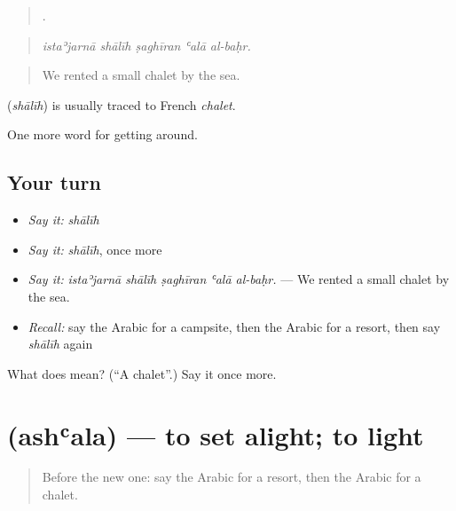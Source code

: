 \begin{quote}
    .
\end{quote}

\begin{quote}
\emph{istaʾjarnā shālīh ṣaghīran ʿalā al-baḥr.}
\end{quote}

\begin{quote}
We rented a small chalet by the sea.
\end{quote}

\begin{cousinweb}
\textbf{} (\emph{shālīh}) is usually traced to French \emph{chalet}.
\end{cousinweb}

\begin{grammarlens}[title={What you've built}]
One more word for getting around.
\end{grammarlens}

\subsection*{Your turn}
\begin{itemize}
\raggedright
  \item \emph{Say it:} \emph{shālīh}
  \item \emph{Say it:} \emph{shālīh}, once more
  \item \emph{Say it:} \emph{istaʾjarnā shālīh ṣaghīran ʿalā al-baḥr.} — We rented a small chalet by the sea.
  \item \emph{Recall:} say the Arabic for a campsite, then the Arabic for a resort, then say \emph{shālīh} again
\end{itemize}

\begin{tcolorbox}[breakable,colback=teal!4,colframe=teal!35!black,title={Before you move on}]
What does  mean? (\textquotedblleft{}A chalet\textquotedblright{}.) Say it once more.
\end{tcolorbox}
\section[\texorpdfstring{\ar{أشعل} (ashʿala)}{أشعل (ashʿala)}]{ (ashʿala) — to set alight; to light}

\label{lesson:AR-C442-ashala}



\begin{quote}
Before the new one: say the Arabic for a resort, then the Arabic for a chalet.
\end{quote}

